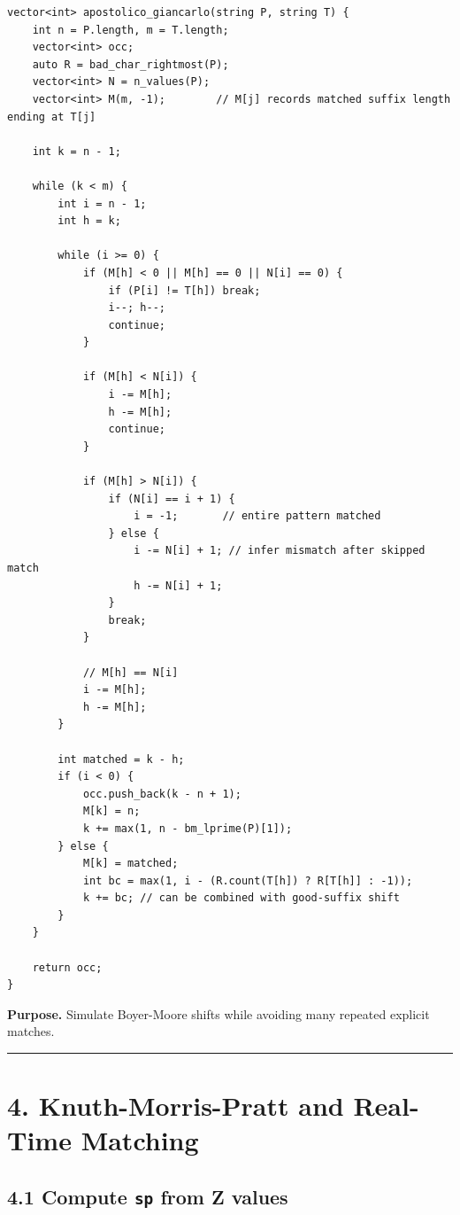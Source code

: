 \documentclass[11pt]{article}
\begin{document}
\begin{verbatim}
vector<int> apostolico_giancarlo(string P, string T) {
    int n = P.length, m = T.length;
    vector<int> occ;
    auto R = bad_char_rightmost(P);
    vector<int> N = n_values(P);
    vector<int> M(m, -1);        // M[j] records matched suffix length ending at T[j]

    int k = n - 1;

    while (k < m) {
        int i = n - 1;
        int h = k;

        while (i >= 0) {
            if (M[h] < 0 || M[h] == 0 || N[i] == 0) {
                if (P[i] != T[h]) break;
                i--; h--;
                continue;
            }

            if (M[h] < N[i]) {
                i -= M[h];
                h -= M[h];
                continue;
            }

            if (M[h] > N[i]) {
                if (N[i] == i + 1) {
                    i = -1;       // entire pattern matched
                } else {
                    i -= N[i] + 1; // infer mismatch after skipped match
                    h -= N[i] + 1;
                }
                break;
            }

            // M[h] == N[i]
            i -= M[h];
            h -= M[h];
        }

        int matched = k - h;
        if (i < 0) {
            occ.push_back(k - n + 1);
            M[k] = n;
            k += max(1, n - bm_lprime(P)[1]);
        } else {
            M[k] = matched;
            int bc = max(1, i - (R.count(T[h]) ? R[T[h]] : -1));
            k += bc; // can be combined with good-suffix shift
        }
    }

    return occ;
}
\end{verbatim}

\textbf{Purpose.} Simulate Boyer-Moore shifts while avoiding many repeated explicit matches.

\begin{center}\rule{0.5\linewidth}{0.5pt}\end{center}

\section{4. Knuth-Morris-Pratt and Real-Time Matching}\label{knuth-morris-pratt-and-real-time-matching}

\subsection{\texorpdfstring{4.1 Compute \texttt{sp} from Z values}{4.1 Compute sp from Z values}}\label{compute-sp-from-z-values}
\end{document}
